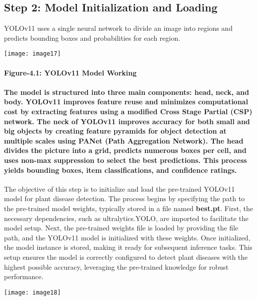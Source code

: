 \documentclass{book} %
\begin{document}
\noindent 

\noindent 
\subsection{Step 2: Model Initialization and Loading}

\noindent YOLOv11 uses a single neural network to divide an image into regions and predicts bounding boxes and probabilities for each region. 

\noindent 

\noindent \texttt{[image: image17]}


\paragraph{    Figure-4.1: YOLOv11 Model Working}

\noindent 
\paragraph{The model is structured into three main components: head, neck, and body. YOLOv11 improves feature reuse and minimizes computational cost by extracting features using a modified Cross Stage Partial (CSP) network. The neck of YOLOv11 improves accuracy for both small and big objects by creating feature pyramids for object detection at multiple scales using PANet (Path Aggregation Network). The head divides the picture into a grid, predicts numerous boxes per cell, and uses non-max suppression to select the best predictions. This process yields bounding boxes, item classifications, and confidence ratings.}

\noindent The objective of this step is to initialize and load the pre-trained YOLOv11 model for plant disease detection. The process begins by specifying the path to the pre-trained model weights, typically stored in a file named \textbf{best.pt}. First, the necessary dependencies, such as ultralytics.YOLO, are imported to facilitate the model setup. Next, the pre-trained weights file is loaded by providing the file path, and the YOLOv11 model is initialized with these weights. Once initialized, the model instance is stored, making it ready for subsequent inference tasks. This setup ensures the model is correctly configured to detect plant diseases with the highest possible accuracy, leveraging the pre-trained knowledge for robust performance.

\noindent 

\noindent \texttt{[image: image18]}
\end{document}
